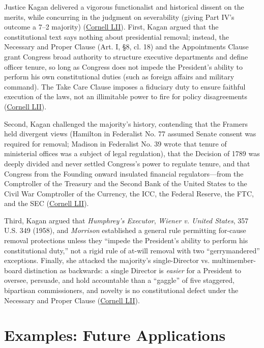 \documentclass[12pt]{article}
\begin{document}
Justice Kagan delivered a vigorous functionalist and historical dissent on the merits, while concurring in the judgment on severability (giving Part IV's outcome a 7--2 majority) (\href{https://www.law.cornell.edu/supremecourt/text/19-7}{Cornell LII}). First, Kagan argued that the constitutional text says nothing about presidential removal; instead, the Necessary and Proper Clause (Art. I, \S 8, cl. 18) and the Appointments Clause grant Congress broad authority to structure executive departments and define officer tenure, so long as Congress does not impede the President's ability to perform his own constitutional duties (such as foreign affairs and military command). The Take Care Clause imposes a fiduciary duty to ensure faithful execution of the laws, not an illimitable power to fire for policy disagreements (\href{https://www.law.cornell.edu/supremecourt/text/19-7}{Cornell LII}).

Second, Kagan challenged the majority's history, contending that the Framers held divergent views (Hamilton in Federalist No. 77 assumed Senate consent was required for removal; Madison in Federalist No. 39 wrote that tenure of ministerial offices was a subject of legal regulation), that the Decision of 1789 was deeply divided and never settled Congress's power to regulate tenure, and that Congress from the Founding onward insulated financial regulators---from the Comptroller of the Treasury and the Second Bank of the United States to the Civil War Comptroller of the Currency, the ICC, the Federal Reserve, the FTC, and the SEC (\href{https://www.law.cornell.edu/supremecourt/text/19-7}{Cornell LII}).

Third, Kagan argued that \textit{Humphrey's Executor}, \textit{Wiener v. United States}, 357 U.S. 349 (1958), and \textit{Morrison} established a general rule permitting for-cause removal protections unless they ``impede the President's ability to perform his constitutional duty,'' not a rigid rule of at-will removal with two ``gerrymandered'' exceptions. Finally, she attacked the majority's single-Director vs. multimember-board distinction as backwards: a single Director is \textit{easier} for a President to oversee, persuade, and hold accountable than a ``gaggle'' of five staggered, bipartisan commissioners, and novelty is no constitutional defect under the Necessary and Proper Clause (\href{https://www.law.cornell.edu/supremecourt/text/19-7}{Cornell LII}).

\section{Examples: Future Applications}
\end{document}
